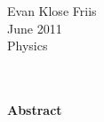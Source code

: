 \def\master{}





\thispagestyle{empty}
\begin{flushright}
  Evan Klose Friis \\
  June 2011 \\
  Physics \\
\end{flushright}


\begin{centering}
  {\Large \PHDTITLE} \\ ~\\
  \textbf{\Large Abstract} \\ ~\\
\end{centering}





